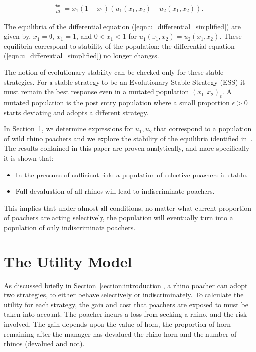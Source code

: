 \documentclass[10pt]{article}
\begin{document}
\begin{eqnarray}
    \label{eqn:u_differential_simplified}
    \frac{dx_1}{dt}= x_1(1 - x_1)(u_1(x_1, x_2) - u_2(x_1, x_2)).
\end{eqnarray}

The equilibria of the differential equation (\ref{eqn:u_differential_simplified})
are given by, \(x_1=0\), \(x_1=1\), and \(0<x_1<1\) for \(u_1(x_1, x_2)=u_2(x_1, x_2)\).
These equilibria correspond to stability of the population: the differential
equation (\ref{eqn:u_differential_simplified}) no longer changes.

The notion of evolutionary stability can be checked only for these stable strategies.
For a stable strategy to be an Evolutionary Stable Strategy (ESS) it must remain
the best response even in a mutated population \((x_1, x_2)_\epsilon\). A mutated population
is the post entry population
where a small proportion \(\epsilon > 0\) starts deviating and adopts a different strategy.

In Section~\ref{section:the_model}, we determine expressions
for \(u_1, u_2\) that correspond to a population of wild rhino poachers and we
explore the stability of the equilibria identified in~\cite{Lee}. The results
contained in this paper are proven analytically, and more specifically it is
shown that:

\begin{itemize}
    \item In the presence of sufficient risk: a population of selective poachers
        is stable.
    \item Full devaluation of all rhinos will lead to indiscriminate poachers.
\end{itemize}

This implies that under almost all conditions, no matter what current proportion
of poachers are acting selectively, the population will eventually turn into a
population of only indiscriminate poachers.

\section{The Utility Model}\label{section:the_model}

As discussed briefly in Section~\ref{section:introduction}, a rhino poacher
can adopt two strategies, to either behave selectively
or indiscriminately. To calculate the utility for each strategy, the gain and cost
that poachers are exposed to must be taken into account. The poacher incurs a
loss from seeking a rhino, and the risk involved. The gain depends upon the value
of horn, the proportion of horn remaining after the manager has devalued the
rhino horn and the number of rhinos (devalued and not).
\end{document}
